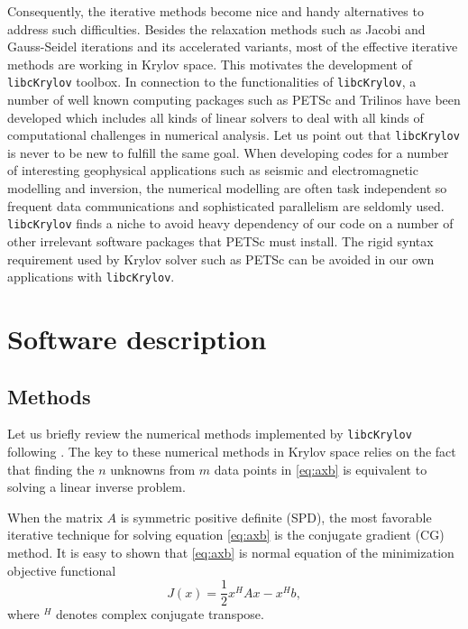 \documentclass[10pt]{article}
\begin{document}
Consequently, the iterative methods become nice and handy alternatives to address such difficulties. Besides the relaxation methods such as Jacobi and Gauss-Seidel iterations and its accelerated variants, most of the effective iterative methods are working in Krylov space. This motivates the development of \verb|libcKrylov| toolbox.
In connection to the functionalities of \verb|libcKrylov|, a number of well known computing packages such as PETSc \citep{petsc-efficient} and Trilinos \citep{heroux2005overview}  have been developed which  includes all kinds of linear solvers to deal with all kinds of computational challenges in numerical analysis. 
Let us point out that \verb|libcKrylov| is never to be new to fulfill the same goal. When developing codes for a number of interesting geophysical applications such as seismic and electromagnetic modelling and inversion, the numerical modelling are often task independent so frequent data communications and sophisticated parallelism are seldomly used.  \verb|libcKrylov| finds a niche to avoid heavy dependency of our code on a number of other irrelevant software packages that PETSc must install. The rigid syntax requirement used by Krylov solver such as PETSc can be avoided in our own applications with \verb|libcKrylov|. 


\section{Software description}

\subsection{Methods}

Let us briefly review the numerical methods implemented by \verb|libcKrylov| following \cite{Saad_2003_IMS}. The key to these numerical methods in Krylov space relies on the fact that finding the $n$ unknowns from  $m$ data points in \eqref{eq:axb} is equivalent to solving a linear inverse problem. 


When the matrix $A$ is symmetric positive definite (SPD), the most favorable iterative technique for solving equation \eqref{eq:axb} is the conjugate gradient (CG) method. It is easy to shown that \eqref{eq:axb} is normal equation of the minimization objective functional
\begin{equation}
J(x) = \frac{1}{2} x^H Ax - x^H b,
\end{equation}
where $^H$ denotes complex conjugate transpose.
\end{document}
